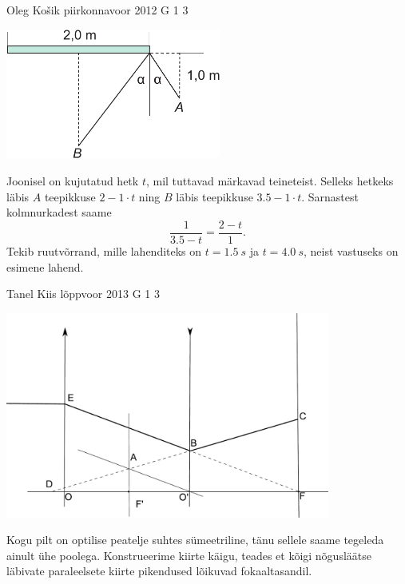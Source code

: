 \documentclass[11pt, twoside]{article}
\begin{document}
{%
{Oleg Košik} %
{piirkonnavoor} %
{2012} %
{G 1} %
{3} %
{

\ifSolution
\begin{center}
\includegraphics[width=200pt]{2012-v2g-01-peegel_lah}
\end{center}

Joonisel on kujutatud hetk $t$, mil tuttavad märkavad teineteist. Selleks hetkeks läbis $A$ teepikkuse $2-1\cdot t$ ning $B$ läbis teepikkuse $\num{3,5}-1\cdot t$. Sarnastest kolmnurkadest saame
\[
\frac{1}{\num{3,5}-t}=\frac{2-t}{1}.
\]
Tekib ruutvõrrand, mille lahenditeks on $t=\SI{1,5}{s}$ ja $t=\SI{4,0}{s}$, neist vastuseks on esimene lahend.
\fi
}

{Tanel Kiis} %
{lõppvoor} %
{2013} %
{G 1} %
{3} %
{

\ifSolution
\begin{center}
	\includegraphics[width=0.8\textwidth]{2013-v3g-01-laats_lah2}\\
\end{center}
Kogu pilt on optilise peatelje suhtes sümeetriline, tänu sellele saame tegeleda ainult ühe poolega. Konstrueerime kiirte käigu, teades et kõigi nõgusläätse läbivate paraleelsete kiirte pikendused lõikuvad fokaaltasandil. 

}}
\end{document}
